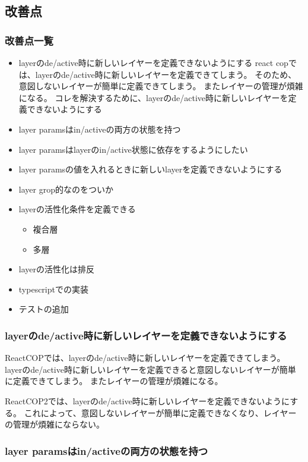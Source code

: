 \documentclass{jsarticle}
\begin{document}
\subsection{改善点}

\subsubsection{改善点一覧}

\begin{itemize}
	\item layerのde/active時に新しいレイヤーを定義できないようにする
	      react copでは、layerのde/active時に新しいレイヤーを定義できてしまう。
	      そのため、意図しないレイヤーが簡単に定義できてしまう。
	      またレイヤーの管理が煩雑になる。
	      コレを解決するために、layerのde/active時に新しいレイヤーを定義できないようにする
	\item layer paramsはin/activeの両方の状態を持つ
	\item layer paramsはlayerのin/active状態に依存をするようにしたい
	\item layer paramsの値を入れるときに新しいlayerを定義できないようにする
	\item layer grop的なのをついか
	\item layerの活性化条件を定義できる
	      \begin{itemize}
		      \item 複合層
		      \item 多層
	      \end{itemize}
	\item layerの活性化は排反
	\item typescriptでの実装
	\item テストの追加
\end{itemize}

\subsubsection{layerのde/active時に新しいレイヤーを定義できないようにする}
ReactCOPでは、layerのde/active時に新しいレイヤーを定義できてしまう。
layerのde/active時に新しいレイヤーを定義できると意図しないレイヤーが簡単に定義できてしまう。
またレイヤーの管理が煩雑になる。

ReactCOP2では、layerのde/active時に新しいレイヤーを定義できないようにする。
これによって、意図しないレイヤーが簡単に定義できなくなり、レイヤーの管理が煩雑にならない。


\subsubsection{layer paramsはin/activeの両方の状態を持つ}
\end{document}
